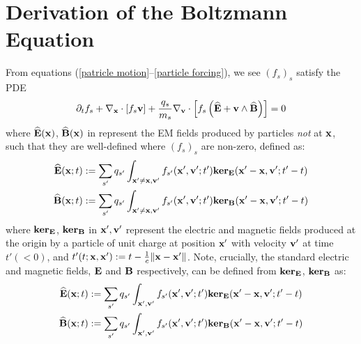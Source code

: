 \chapter{Derivation of the Boltzmann Equation}\label{Boltzmann equation derivation}
    From equations (\ref{patricle motion}–\ref{particle forcing}), we see $(f_{s})_{s}$ satisfy the PDE
    \begin{equation}\label{exact Boltzmann equation}
        \partial_{t}f_{s} + \nabla_{\mathbf{x}}\cdot[f_{s}\mathbf{v}] + \frac{q_{s}}{m_{s}}\nabla_{\mathbf{v}}\cdot\left[f_{s}\left(\widehat{\mathbf{E}} + \mathbf{v}\wedge\widehat{\mathbf{B}}\right)\right]  =  0
    \end{equation}
    where $\widehat{\mathbf{E}}(\mathbf{x})$, $\widehat{\mathbf{B}}(\mathbf{x})$ in represent the EM fields produced by particles \emph{not} at $\mathbf{x}$, such that they are well-defined where $(f_{s})_{s}$ are non-zero, defined as:
    \begin{align}
        \widehat{\mathbf{E}}(\mathbf{x}; t)  &:=  \sum_{s'}q_{s'}\int_{\mathbf{x}' \neq \mathbf{x}, \mathbf{v}'}f_{s'}(\mathbf{x}', \mathbf{v}'; t'){\bf ker}_{\mathbf{E}}(\mathbf{x}' - \mathbf{x}, \mathbf{v}'; t' - t)  \\
        \widehat{\mathbf{B}}(\mathbf{x}; t)  &:=  \sum_{s'}q_{s'}\int_{\mathbf{x}' \neq \mathbf{x}, \mathbf{v}'}f_{s'}(\mathbf{x}', \mathbf{v}'; t'){\bf ker}_{\mathbf{B}}(\mathbf{x}' - \mathbf{x}, \mathbf{v}'; t' - t)  \\
    \end{align}
    where ${\bf ker}_{\mathbf{E}}$, ${\bf ker}_{\mathbf{B}}$ in $\mathbf{x}', \mathbf{v}'$ represent the electric and magnetic fields produced at the origin by a particle of unit charge at position $\mathbf{x}'$ with velocity $\mathbf{v}'$ at time $t' (< 0)$, and $t'(t; \mathbf{x}, \mathbf{x}') := t - \frac{1}{c}\|\mathbf{x} - \mathbf{x}'\|$. Note, crucially, the standard electric and magnetic fields, $\mathbf{E}$ and $\mathbf{B}$ respectively, can be defined from ${\bf ker}_{\mathbf{E}}$, ${\bf ker}_{\mathbf{B}}$ as:
    \begin{align}
        \widehat{\mathbf{E}}(\mathbf{x}; t)  &:=  \sum_{s'}q_{s'}\int_{\mathbf{x}', \mathbf{v}'}f_{s'}(\mathbf{x}', \mathbf{v}'; t'){\bf ker}_{\mathbf{E}}(\mathbf{x}' - \mathbf{x}, \mathbf{v}'; t' - t)  \\
        \widehat{\mathbf{B}}(\mathbf{x}; t)  &:=  \sum_{s'}q_{s'}\int_{\mathbf{x}', \mathbf{v}'}f_{s'}(\mathbf{x}', \mathbf{v}'; t'){\bf ker}_{\mathbf{B}}(\mathbf{x}' - \mathbf{x}, \mathbf{v}'; t' - t)  \\
    \end{align}

